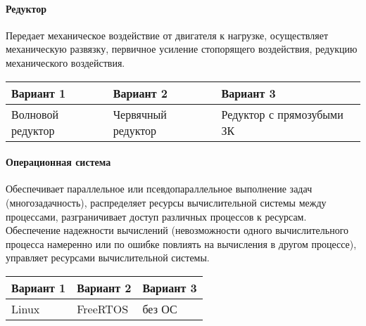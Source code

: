 \paragraph{Редуктор}
Передает механическое воздействие от двигателя к
нагрузке, осуществляет механическую развязку, первичное усиление
стопорящего воздействия, редукцию механического воздействия.

\begin{tabular}{|p{5cm}|p{5cm}|p{5cm}|}
    \hline
    Вариант 1 & Вариант 2 & Вариант 3 \\
    \hline
    Волновой редуктор &
    Червячный редуктор &
    Редуктор с прямозубыми ЗК \\
    \hline
\end{tabular}

\paragraph{Операционная система}
Обеспечивает параллельное или псевдопараллельное
выполнение задач (многозадачность), распределяет ресурсы вычислительной
системы между процессами, разграничивает доступ различных процессов к
ресурсам. Обеспечение надежности вычислений (невозможности одного
вычислительного процесса намеренно или по ошибке повлиять на вычисления
в другом процессе), управляет ресурсами вычислительной системы.

\begin{tabular}{|p{5cm}|p{5cm}|p{5cm}|}
    \hline
    Вариант 1 & Вариант 2 & Вариант 3 \\
    \hline
    Linux &
    FreeRTOS &
    без ОС \\
    \hline
\end{tabular}


